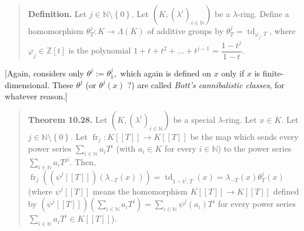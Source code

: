\documentclass[numbers=enddot,12pt,final,onecolumn,notitlepage]{scrartcl}%
\begin{document}
\begin{quote}
\textbf{Definition.} Let $j\in\mathbb{N}\setminus\left\{  0\right\}  $. Let
$\left(  K,\left(  \lambda^{i}\right)  _{i\in\mathbb{N}}\right)  $ be a
$\lambda$-ring. Define a homomorphism $\theta_{T}^{j}:K\rightarrow
\Lambda\left(  K\right)  $ of additive groups by $\theta_{T}^{j}%
=\operatorname*{td}_{\varphi_{j},T}$, where $\varphi_{j}\in\mathbb{Z}\left[
t\right]  $ is the polynomial $1+t+t^{2}+...+t^{j-1}=\dfrac{1-t^{j}}{1-t}$.
\end{quote}

[Again, \cite{FulLan85} considers only $\theta^{j}:=\theta_{1}^{j},$ which
again is defined on $x$ only if $x$ is finite-dimensional. These $\theta^{j}$
(or $\theta^{j}\left(  x\right)  $ ?) are called \textit{Bott's cannibalistic
classes}, for whatever reason.]

\begin{quote}
\textbf{Theorem 10.28.} Let $\left(  K,\left(  \lambda^{i}\right)
_{i\in\mathbb{N}}\right)  $ be a special $\lambda$-ring. Let $x\in K$. Let
$j\in\mathbb{N}\setminus\left\{  0\right\}  $. Let $\operatorname*{fr}%
\nolimits_{j}:K\left[  \left[  T\right]  \right]  \rightarrow K\left[  \left[
T\right]  \right]  $ be the map which sends every power series $\sum
\limits_{i\in\mathbb{N}}a_{i}T^{i}$ (with $a_{i}\in K$ for every
$i\in\mathbb{N}$) to the power series $\sum\limits_{i\in\mathbb{N}}a_{i}%
T^{ji}$. Then, $\operatorname*{fr}\nolimits_{j}\left(  \left(  \psi^{j}\left[
\left[  T\right]  \right]  \right)  \left(  \lambda_{-T}\left(  x\right)
\right)  \right)  =\operatorname*{td}\nolimits_{1-t^{j},T}\left(  x\right)
=\lambda_{-T}\left(  x\right)  \theta_{T}^{j}\left(  x\right)  $ (where
$\psi^{j}\left[  \left[  T\right]  \right]  $ means the homomorphism $K\left[
\left[  T\right]  \right]  \rightarrow K\left[  \left[  T\right]  \right]  $
defined by $\left(  \psi^{j}\left[  \left[  T\right]  \right]  \right)
\left(  \sum\limits_{i\in\mathbb{N}}a_{i}T^{i}\right)  =\sum\limits_{i\in
\mathbb{N}}\psi^{j}\left(  a_{i}\right)  T^{i}$ for every power series
$\sum\limits_{i\in\mathbb{N}}a_{i}T^{i}\in K\left[  \left[  T\right]  \right]
$).
\end{quote}
\end{document}
